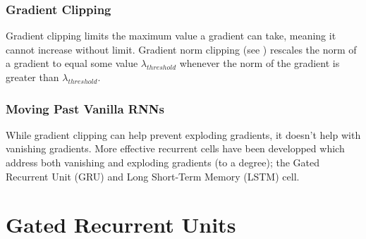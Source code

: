 \documentclass[]{article}
\begin{document}
\subsubsection{Gradient Clipping}
Gradient clipping limits the maximum value a gradient can take, meaning it cannot increase without limit. Gradient norm clipping (see \cite{10.5555/3042817.3043083}) rescales the norm of a gradient to equal some value $\lambda_{threshold}$ whenever the norm of the gradient is greater than $\lambda_{threshold}$.
\subsubsection{Moving Past Vanilla RNNs}
While gradient clipping can help prevent exploding gradients, it doesn't help with vanishing gradients. More effective recurrent cells have been developped which address both vanishing and exploding gradients (to a degree); the Gated Recurrent Unit (GRU) and Long Short-Term Memory (LSTM) cell.

\section{Gated Recurrent Units}
\end{document}
